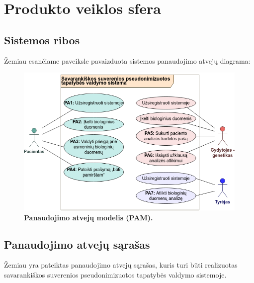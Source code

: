 \documentclass[12pt]{article}
\begin{document}
\newpage

\section{Produkto veiklos sfera}
\subsection{Sistemos ribos}
Žemiau esančiame paveiksle pavaizduota sistemos panaudojimo atvejų diagrama:

\begin{figure}[ht]
    \begin{center}
        \captionsetup{justification=centering}
        \includegraphics[width=0.9\linewidth]{PAM.png}
        \vspace{-1\baselineskip}
        \caption{\small\textbf{Panaudojimo atvejų modelis (PAM).}}
        \label{fig:image2}
    \end{center}
\end{figure}

\subsection{Panaudojimo atvejų sąrašas}
Žemiau yra pateiktas panaudojimo atvejų sąrašas, kuris turi būti realizuotas
savarankiškos suverenios pseudonimizuotos tapatybės valdymo sistemoje.
\end{document}
